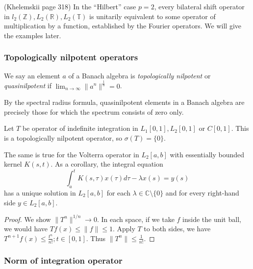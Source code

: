 \begin{remark}
	(Khelemskii page 318) In the ``Hilbert'' case $p = 2$, every bilateral shift operator in $l_2(\mathbb{Z}), L_2(\mathbb{R}), L_2(\mathbb{T})$ is unitarily equivalent to some operator of multiplication by a function, established by the Fourier operators. We will give the examples later.
\end{remark}

\subsubsection{Topologically nilpotent operators}

\begin{definition}
	\label{defn:QuasinilpotentOperators}
	We say an element $a$ of a Banach algebra is \textit{topologically nilpotent} or \textit{quasinilpotent} if $\lim_{n \to \infty} \|a^n\|^{\frac{1}{n}} = 0$.

\end{definition}

By the spectral radius formula, quasinilpotent elements in a Banach algebra are precisely those for which the spectrum consists of zero only.

\begin{proposition}
	\label{prop:SpectVolterroperator}
	Let $T$ be operator of indefinite integration in $L_1[0,1], L_2[0,1]$ or $C[0,1]$. This is a topologically nilpotent operator, so $\sigma(T) = \{0\} $.

	The same is true for the Volterra operator in $L_2[a,b]$ with essentially bounded kernel $K(s,t)$. As a corollary, the integral equation
	\[
		\int _a^t K(s, \tau) x(\tau) d \tau - \lambda x(s) = y(s)
	\] 
	has a unique solution in $L_2[a,b] $ for each $\lambda \in \mathbb{C} \setminus \{0\} $ and for every right-hand side $y \in L_2[a,b]$.
\end{proposition}
\begin{proof}
	We show $\|T^n\|^{1 / n} \to 0$. In each space, if we take $f$ inside the unit ball, we would have $T f(x) \le \|f\| \le 1$. Apply $T$ to both sides, we have $T^{n+1} f(x) \le \frac{t^n}{n!}; t \in [0,1]$. Thus $\|T^n\| \le \frac{1}{n!}$.
\end{proof}

\subsubsection{Norm of integration operator}



